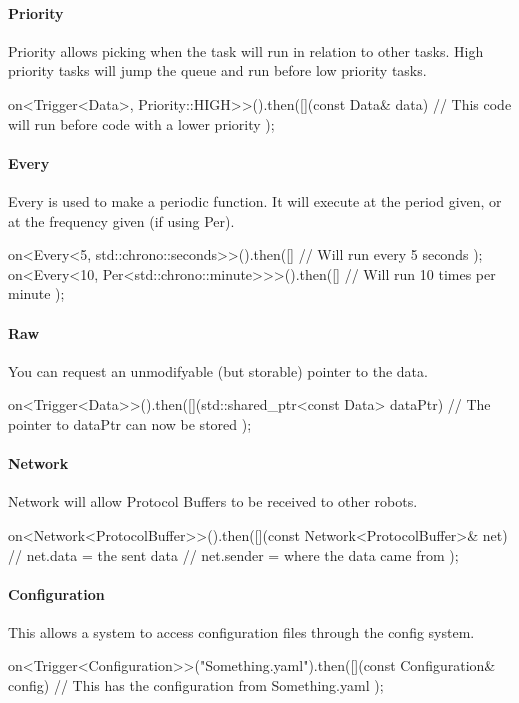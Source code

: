 \documentclass[a4paper]{article}
\begin{document}
    \paragraph{Priority} Priority allows picking when the task will run in relation to other tasks.
    High priority tasks will jump the queue and run before low priority tasks.\\
    \begin{cppcode}
        on<Trigger<Data>, Priority::HIGH>>().then([](const Data& data) {
            // This code will run before code with a lower priority
        });
    \end{cppcode}

    \paragraph{Every} Every is used to make a periodic function.
    It will execute at the period given, or at the frequency given (if using Per).\\
    \begin{cppcode}
        on<Every<5, std::chrono::seconds>>().then([] {
            // Will run every 5 seconds
        });
        on<Every<10, Per<std::chrono::minute>>>().then([] {
            // Will run 10 times per minute
        });
    \end{cppcode}

    \paragraph{Raw} You can request an unmodifyable (but storable) pointer to the data.\\
    \begin{cppcode}
        on<Trigger<Data>>().then([](std::shared_ptr<const Data> dataPtr) {
            // The pointer to dataPtr can now be stored
        });
    \end{cppcode}

    \paragraph{Network} Network will allow Protocol Buffers to be received to other robots.\\
    \begin{cppcode}
        on<Network<ProtocolBuffer>>().then([](const Network<ProtocolBuffer>& net) {
            // net.data = the sent data
            // net.sender = where the data came from
        });
    \end{cppcode}

    \paragraph{Configuration} This allows a system to access configuration files through the config system.\\
    \begin{cppcode}

        on<Trigger<Configuration>>("Something.yaml").then([](const Configuration& config) {
            // This has the configuration from Something.yaml
        });
    \end{cppcode}
\end{document}
